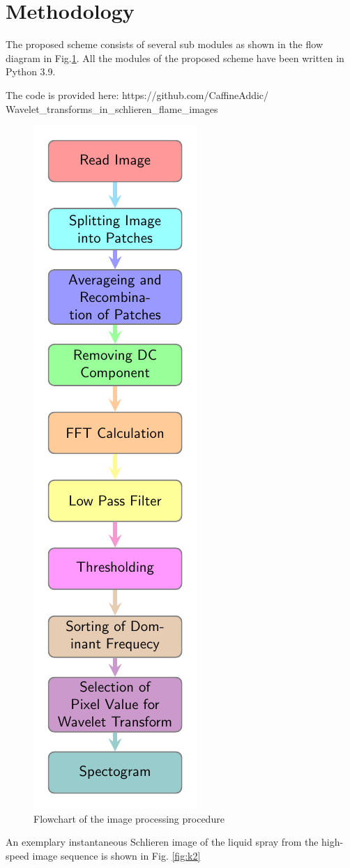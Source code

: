 \documentclass[conference]{IEEEtran}
\begin{document}
	
	\section*{Methodology}
	
	The proposed scheme consists of several sub modules as
	shown in the flow diagram in Fig.\ref{fig:k1}. All the modules of the
	proposed scheme have been written in Python 3.9.
	
	The code is provided here: https://github.com/CaffineAddic/ Wavelet\_transforms\_in\_schlieren\_flame\_images
	
	\begin{figure}[H]
		\centering
		\includegraphics[scale=1.11]{plot/meth.pdf}
		\caption{Flowchart of the image processing procedure}\label{fig:k1}
			\end{figure}
			An exemplary instantaneous Schlieren image of the
			liquid spray from the high-speed image sequence is shown
			in Fig. \ref{fig:k2} 
	
\end{document}
